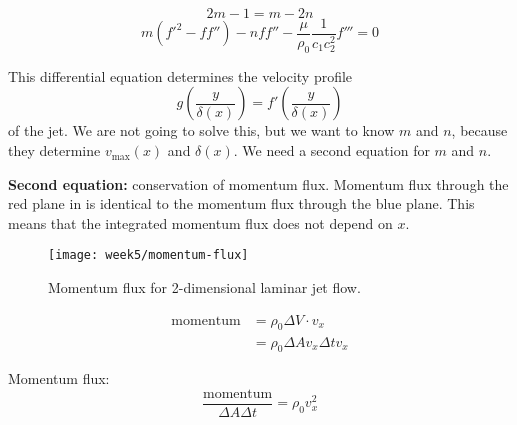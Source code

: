 \begin{framed}
\begin{equation}
2m-1 = m-2n
\end{equation}
\begin{equation}
m(f'^2-ff'')-nff''-\frac{\mu}{\rho_0}\frac{1}{c_1c_2^2}f'''=0
\end{equation}
\end{framed}

This differential equation determines the velocity profile
\begin{equation}
g\left(\frac{y}{\delta(x)}\right)=f'\left(\frac{y}{\delta(x)}\right)
\end{equation}
of the jet. We are not going to solve this, but we want to know $m$ and $n$, because they determine $v_\mathrm{max}(x)$ and $\delta(x)$. We need a second equation for $m$ and $n$.

\textbf{Second equation:} conservation of momentum flux.
Momentum flux through the red plane in  is identical to the momentum flux through the blue plane. This means that the integrated momentum flux does not depend on $x$.
\begin{figure}[!h]
    \centering
    \texttt{[image: week5/momentum-flux]}\\
    \caption{Momentum flux for 2-dimensional laminar jet flow.}
    \label{fig:momentum-flux}
\end{figure}

\begin{align}
\mathrm{momentum} & =\rho_0\Delta V\cdot v_x\\
&= \rho_0\Delta Av_x\Delta tv_x
\end{align}

Momentum flux:
\begin{equation}
\frac{\mathrm{momentum}}{\Delta A \Delta t} = \rho_0 v_x^2
\end{equation}

